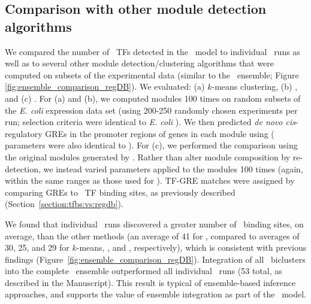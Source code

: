 \subsection{Comparison with other module detection algorithms}

We compared the number of \rdb~TFs detected in the \egrine~model to individual \cm~runs as well as to several other module detection/clustering algorithms that were computed on subsets of the experimental data (similar to the \egrine~ensemble; Figure \ref{fig:ensemble_comparison_regDB}). We evaluated: (a) $k$-means clustering, (b)  \cite{langfelder_wgcna:_2008}, and (c)  \cite{lemmens_distiller:_2009}. For (a) and (b), we computed modules 100 times on random subsets of the {\it E. coli} expression data set (using 200-250 randomly chosen experiments per run; selection criteria were identical to {\it E. coli} \egrine). We then predicted {\it de novo cis}-regulatory GREs in the promoter regions of genes in each module using  ( parameters were also identical to \egrine). For (c), we performed the comparison using the original modules generated by \cite{lemmens_distiller:_2009}. Rather than alter module composition by re-detection, we instead varied  parameters applied to the modules 100 times (again, within the same ranges as those used for \egrine). TF-GRE matches were assigned by comparing GREs to \rdb~TF binding sites, as previously described (Section~\ref{section:tfbs:vs:regdb}).

We found that individual \cm~runs discovered a greater number of \rdb~binding sites, on average, than the other methods (an average of 41 for \cm, compared to averages of 30, 25, and 29 for $k$-means, , and , respectively), which is consistent with previous findings \cite{reiss_integrated_2006} (Figure~\ref{fig:ensemble_comparison_regDB}). Integration of all \cm~biclusters into the complete \egrine~ensemble outperformed all individual \cm~runs (53 total, as described in the Manuscript). This result is typical of ensemble-based inference approaches, and supports the value of ensemble integration as part of the \egrine\ model.

